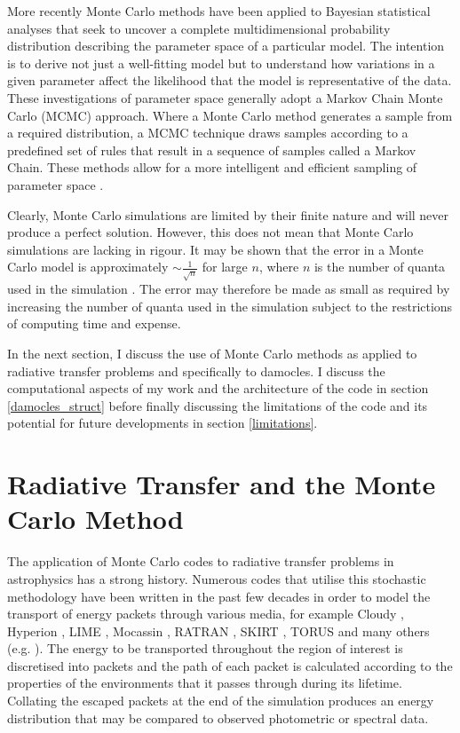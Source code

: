 More recently Monte Carlo methods have been applied to Bayesian statistical analyses that seek to uncover a complete multidimensional probability distribution describing the parameter space of a particular model.  The intention is to derive not just a well-fitting model but to understand how variations in a given parameter affect the likelihood that the model is representative of the data.  These investigations of parameter space generally adopt a Markov Chain Monte Carlo (MCMC) approach.  Where a Monte Carlo method generates a sample from a required distribution, a MCMC technique draws samples according to a predefined set of rules that result in a sequence of samples called a Markov Chain.  These methods allow for a more intelligent and efficient sampling of parameter space \citep{Metropolis1953, Hastings1970, Gilks1996}.  

Clearly, Monte Carlo simulations are limited by their finite nature and will never produce a perfect solution.  However, this does not mean that Monte Carlo simulations are lacking in rigour.  It may be shown that the error in a Monte Carlo model is approximately $\sim \frac{1}{\sqrt{n}}$ for large $n$, where $n$ is the number of quanta used in the simulation \citep{Press2007}.  The error may therefore be made as small as required by increasing the number of quanta used in the simulation subject to the restrictions of computing time and expense.

In the next section, I discuss the use of Monte Carlo methods as applied to radiative transfer problems and specifically to {\sc damocles}.  I discuss the computational aspects of my work and the architecture of the code in section \ref{damocles_struct} before finally discussing the limitations of the code and its potential for future developments in section \ref{limitations}.

\section{Radiative Transfer and the Monte Carlo Method}
\label{rt}

The application of Monte Carlo codes to radiative transfer problems in astrophysics has a strong history.  Numerous codes that utilise this stochastic methodology have been written in the past few decades in order to model the transport of energy packets through various media, for example Cloudy \citep{Ferland2013}, Hyperion \citep{Robitaille2011}, LIME \citep{Brinch2010}, Mocassin \citep{Ercolano2003, Ercolano2005}, RATRAN \citep{Hogerheijde2000}, SKIRT \citep{Baes2003}, TORUS \citep{Harries2000} and many others (e.g. \citep{Wood2001}).  The energy to be transported throughout the region of interest is discretised into packets and the path of each packet is calculated according to the properties of the environments that it passes through during its lifetime.  Collating the escaped packets at the end of the simulation produces an energy distribution that may be compared to observed photometric or spectral data. 

